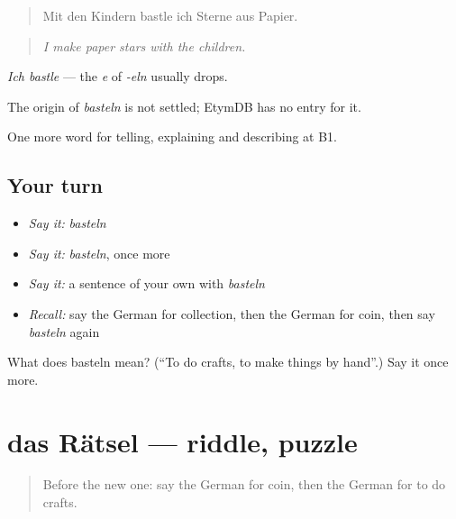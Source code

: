 \begin{quote}
Mit den Kindern bastle ich Sterne aus Papier.
\end{quote}

\begin{quote}
\emph{I make paper stars with the children.}
\end{quote}

\emph{Ich bastle} — the \emph{e} of \emph{-eln} usually drops.

\begin{cousinweb}
The origin of \emph{basteln} is not settled; EtymDB has no entry for it.
\end{cousinweb}

\begin{grammarlens}[title={What you've built}]
One more word for telling, explaining and describing at B1.
\end{grammarlens}

\subsection*{Your turn}
\begin{itemize}
\raggedright
  \item \emph{Say it:} \emph{basteln}
  \item \emph{Say it:} \emph{basteln}, once more
  \item \emph{Say it:} a sentence of your own with \emph{basteln}
  \item \emph{Recall:} say the German for collection, then the German for coin, then say \emph{basteln} again
\end{itemize}

\begin{tcolorbox}[breakable,colback=teal!4,colframe=teal!35!black,title={Before you move on}]
What does basteln mean? (\textquotedblleft{}To do crafts, to make things by hand\textquotedblright{}.) Say it once more.
\end{tcolorbox}
\section[das Rätsel]{das Rätsel — riddle, puzzle}

\label{lesson:GE-C500-raetsel}



\begin{quote}
Before the new one: say the German for coin, then the German for to do crafts.
\end{quote}

